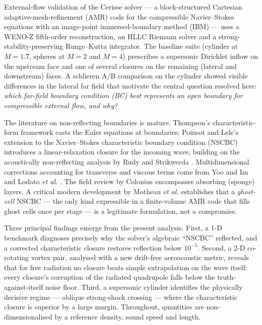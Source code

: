 \documentclass{jfm}
\begin{document}
External-flow validation of the Cerisse solver --- a block-structured Cartesian
adaptive-mesh-refinement (AMR) code for the compressible Navier--Stokes
equations with an image-point immersed-boundary method (IBM) --- uses a WENO-Z
fifth-order reconstruction, an HLLC Riemann solver and a strong-stability-preserving
Runge--Kutta integrator. The baseline suite (cylinder at $M=1.7$, spheres at $M=2$
and $M=4$) prescribes a supersonic Dirichlet inflow on the upstream face and
one of several closures on the remaining (lateral and downstream) faces. A
schlieren A/B comparison on the cylinder showed visible differences in the
lateral far field that motivate the central question resolved here: \emph{which
far-field boundary condition (BC) best represents an open boundary for
compressible external flow, and why?}

The literature on non-reflecting boundaries is mature. Thompson's
characteristic-form framework \citep{thompson1987} casts the Euler equations at
boundaries; Poinsot and Lele's \citep{poinsot1992} extension to the Navier--Stokes
characteristic boundary condition (NSCBC) introduces a linear-relaxation closure
for the incoming wave, building on the acoustically non-reflecting analysis by
Rudy and Strikwerda \citep{rudy1980}. Multidimensional corrections accounting
for transverse and viscous terms come from Yoo and Im \citep{yoo2007} and Lodato
\textit{et al.} \citep{lodato2008}. The field review by Colonius \citep{colonius2004}
encompasses absorbing (sponge) layers. A critical modern development by Motheau
\textit{et al.} \citep{motheau2017} establishes that a \emph{ghost-cell} NSCBC ---
the only kind expressible in a finite-volume AMR code that fills ghost cells once per
stage --- is a legitimate formulation, not a compromise.

Three principal findings emerge from the present analysis. First, a 1-D benchmark
diagnoses precisely why the solver's algebraic ``NSCBC'' reflected, and a corrected
characteristic closure restores reflection below $10^{-5}$. Second, a 2-D co-rotating
vortex pair, analysed with a new drift-free aeroacoustic metric, reveals that for free
radiation no closure beats simple extrapolation on the wave itself: every closure's
corruption of the radiated quadrupole falls below the truth-against-itself noise floor.
Third, a supersonic cylinder identifies the physically decisive regime --- oblique
strong-shock crossing --- where the characteristic closure is superior by a large
margin. Throughout, quantities are non-dimensionalised by a reference density, sound
speed and length.
\end{document}

